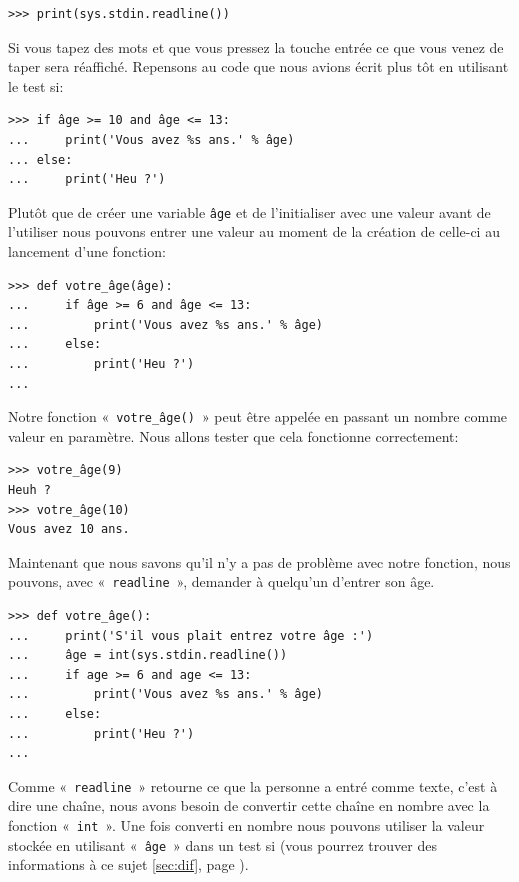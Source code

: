 \begin{Verbatim}[frame=single,rulecolor=\color{mbleu}, label=à taper]
>>> print(sys.stdin.readline())
\end{Verbatim}

Si vous tapez des mots et que vous pressez la touche entrée ce que vous venez de taper sera réaffiché. Repensons au code que nous avions écrit plus tôt en utilisant le test si:

\begin{Verbatim}[frame=single,rulecolor=\color{gray}, label=ne pas saisir]
>>> if âge >= 10 and âge <= 13:
...     print('Vous avez %s ans.' % âge)
... else:
...     print('Heu ?')
\end{Verbatim}

Plutôt que de créer une variable \texttt{âge} et de l'initialiser avec une valeur avant de l'utiliser nous pouvons  entrer une valeur au moment de la création de celle-ci au lancement d'une fonction:

\begin{Verbatim}[frame=single,rulecolor=\color{mbleu}, label=à taper]
>>> def votre_âge(âge):
...     if âge >= 6 and âge <= 13:
...         print('Vous avez %s ans.' % âge)
...     else:
...         print('Heu ?')
...
\end{Verbatim}

Notre fonction « \texttt{votre\_âge()} » peut être appelée en passant un nombre comme valeur en paramètre. Nous allons tester que cela fonctionne correctement: 

\begin{Verbatim}[frame=single,rulecolor=\color{mbleu}, label=à taper]
>>> votre_âge(9)
Heuh ?
>>> votre_âge(10)
Vous avez 10 ans.
\end{Verbatim}

Maintenant que nous savons qu'il n'y a pas de problème avec notre fonction, nous pouvons,
avec « \texttt{readline} », demander à quelqu'un d'entrer son âge.


\begin{Verbatim}[frame=single,rulecolor=\color{mbleu}, label=à taper]
>>> def votre_âge():
...     print('S'il vous plait entrez votre âge :')
...     âge = int(sys.stdin.readline())
...     if age >= 6 and age <= 13:
...         print('Vous avez %s ans.' % âge)
...     else:
...         print('Heu ?')
...
\end{Verbatim}

Comme « \texttt{readline} » retourne ce que la personne a entré comme texte, c'est à dire une chaîne, nous avons besoin de convertir cette chaîne en nombre avec la fonction « \texttt{int} ». Une fois converti en nombre nous pouvons utiliser la valeur stockée en utilisant « \texttt{âge} » dans un test si (vous pourrez trouver des informations à ce sujet \autoref{sec:dif}, page \pageref{sec:dif}).

